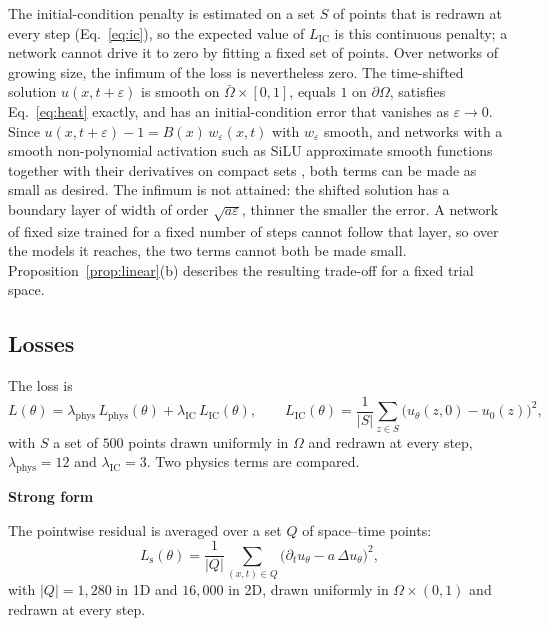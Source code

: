 \documentclass[a4paper,fleqn]{cas-sc}
\newcommand{\runhead}[1]{\par\medskip\noindent\textbf{#1}\par\nopagebreak\noindent\ignorespaces}
\begin{document}
The initial-condition penalty is estimated on a set $S$ of points that is redrawn at every step (Eq.~\eqref{eq:ic}), so the
expected value of $L_{\mathrm{IC}}$ is this continuous penalty; a network
cannot drive it to zero by fitting a fixed set of points. Over networks of growing size, the infimum of the loss is nevertheless
zero. The time-shifted solution $u(x,t+\varepsilon)$ is smooth on $\bar\Omega\times[0,1]$, equals $1$ on $\partial\Omega$,
satisfies Eq.~\eqref{eq:heat} exactly, and has an initial-condition error that vanishes as $\varepsilon\to0$. Since
$u(x,t+\varepsilon)-1=B(x)\,w_\varepsilon(x,t)$ with $w_\varepsilon$ smooth, and networks with a smooth non-polynomial
activation such as SiLU approximate smooth functions together with their derivatives on compact sets \cite{pinkus1999},
both terms can be made as small as desired. The infimum is not attained: the shifted solution has a boundary layer of width of order $\sqrt{a\varepsilon}$, thinner the smaller the
error. A network of fixed size trained for a fixed number of steps cannot follow that layer, so over the models it
reaches, the two terms cannot both be made small. Proposition~\ref{prop:linear}(b) describes the resulting trade-off
for a fixed trial space.

\subsection{Losses}
\label{sec:losses}

The loss is
\begin{equation}
L(\theta) = \lambda_{\mathrm{phys}}\,L_{\mathrm{phys}}(\theta) + \lambda_{\mathrm{IC}}\,L_{\mathrm{IC}}(\theta),
\qquad
L_{\mathrm{IC}}(\theta) = \frac{1}{|S|}\sum_{z\in S}\bigl(u_\theta(z,0)-u_0(z)\bigr)^2,
\label{eq:ic}
\end{equation}
with $S$ a set of $500$ points drawn uniformly in $\Omega$ and redrawn at every step, $\lambda_{\mathrm{phys}}=12$ and $\lambda_{\mathrm{IC}}=3$. Two
physics terms are compared.

\runhead{Strong form}
The pointwise residual is averaged over a set $Q$ of space--time points:
\begin{equation}
L_{\mathrm{s}}(\theta) = \frac{1}{|Q|}\sum_{(x,t)\in Q}\bigl(\partial_t u_\theta - a\,\Delta u_\theta\bigr)^2,
\label{eq:strong}
\end{equation}
with $|Q|=1{,}280$ in 1D and $16{,}000$ in 2D, drawn uniformly in $\Omega\times(0,1)$ and redrawn at every step.
\end{document}
